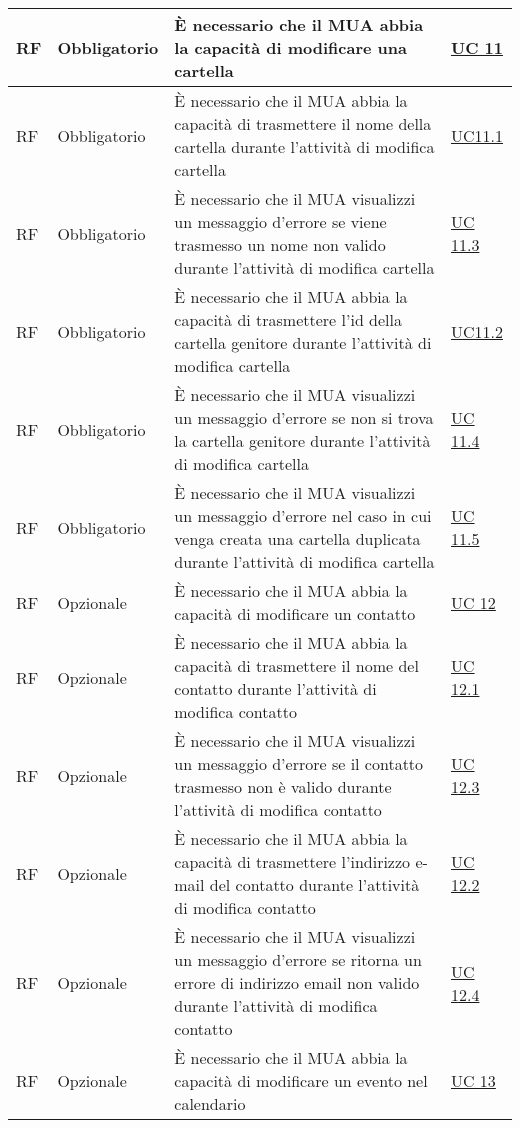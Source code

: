 \begin{longtable}{*{1}{>{\centering\arraybackslash}p{1.5cm}}*{1}{>{\centering\arraybackslash}p{2.5cm}}p{6cm}*{1}{>{\centering\arraybackslash}p{3cm}}}
    \\\hline
    RF & Obbligatorio & È necessario che il MUA abbia la capacità di modificare una cartella & \hyperref[sec:UC11]{UC 11}
    \\\hline
    RF & Obbligatorio & È necessario che il MUA abbia la capacità di trasmettere il nome della cartella durante l'attività di modifica cartella & \hyperref[sec:UC11.1]{UC11.1}
    \\\hline
    RF & Obbligatorio & È necessario che il MUA visualizzi un messaggio d'errore se viene trasmesso un nome non valido durante l'attività di modifica cartella & \hyperref[sec:UC11.3]{UC 11.3}
    \\\hline
    RF & Obbligatorio & È necessario che il MUA abbia la capacità di trasmettere l'id della cartella genitore durante l'attività di modifica cartella & \hyperref[sec:UC11.2]{UC11.2}
    \\\hline
    RF & Obbligatorio & È necessario che il MUA visualizzi un messaggio d'errore se non si trova la cartella genitore durante l'attività di modifica cartella & \hyperref[sec:UC11.4]{UC 11.4}
    \\\hline
    RF & Obbligatorio & È necessario che il MUA visualizzi un messaggio d'errore nel caso in cui venga creata una cartella duplicata durante l'attività di modifica cartella & \hyperref[sec:UC11.5]{UC 11.5}
    \\\hline
    RF & Opzionale & È necessario che il MUA abbia la capacità di modificare un contatto & \hyperref[sec:UC12]{UC 12}
    \\\hline
    RF & Opzionale & È necessario che il MUA abbia la capacità di trasmettere il nome del contatto durante l'attività di modifica contatto & \hyperref[sec:UC12.1]{UC 12.1}
    \\\hline
    RF & Opzionale & È necessario che il MUA visualizzi un messaggio d'errore se il contatto trasmesso non è valido durante l'attività di modifica contatto & \hyperref[sec:UC12.3]{UC 12.3}
    \\\hline  
    RF & Opzionale & È necessario che il MUA abbia la capacità di trasmettere l'indirizzo e-mail del contatto durante l'attività di modifica contatto & \hyperref[sec:UC12.2]{UC 12.2}
    \\\hline
    RF & Opzionale & È necessario che il MUA visualizzi un messaggio d'errore se ritorna un errore di indirizzo email non valido durante l'attività di modifica contatto & \hyperref[sec:UC12.4]{UC 12.4}
    \\\hline
    RF & Opzionale & È necessario che il MUA abbia la capacità di modificare un evento nel calendario & \hyperref[sec:UC13]{UC 13}

\end{longtable}
